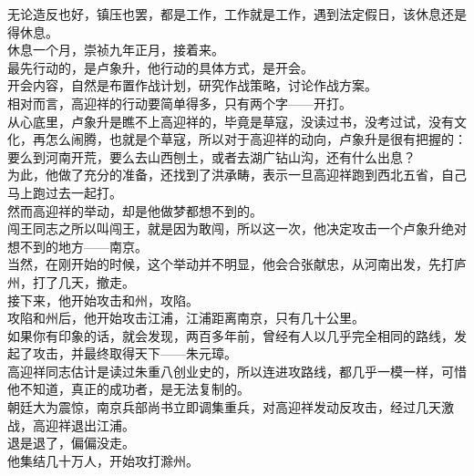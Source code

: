\begin{multicols}{\theparacolNo}
无论造反也好，镇压也罢，都是工作，工作就是工作，遇到法定假日，该休息还是得休息。\\

休息一个月，崇祯九年正月，接着来。\\

最先行动的，是卢象升，他行动的具体方式，是开会。\\

开会内容，自然是布置作战计划，研究作战策略，讨论作战方案。\\

相对而言，高迎祥的行动要简单得多，只有两个字——开打。\\

从心底里，卢象升是瞧不上高迎祥的，毕竟是草寇，没读过书，没考过试，没有文化，再怎么闹腾，也就是个草寇，所以对于高迎祥的动向，卢象升是很有把握的：要么到河南开荒，要么去山西刨土，或者去湖广钻山沟，还有什么出息？\\

为此，他做了充分的准备，还找到了洪承畴，表示一旦高迎祥跑到西北五省，自己马上跑过去一起打。\\

然而高迎祥的举动，却是他做梦都想不到的。\\

闯王同志之所以叫闯王，就是因为敢闯，所以这一次，他决定攻击一个卢象升绝对想不到的地方——南京。\\

当然，在刚开始的时候，这个举动并不明显，他会合张献忠，从河南出发，先打庐州，打了几天，撤走。\\

接下来，他开始攻击和州，攻陷。\\

攻陷和州后，他开始攻击江浦，江浦距离南京，只有几十公里。\\

如果你有印象的话，就会发现，两百多年前，曾经有人以几乎完全相同的路线，发起了攻击，并最终取得天下——朱元璋。\\

高迎祥同志估计是读过朱重八创业史的，所以连进攻路线，都几乎一模一样，可惜他不知道，真正的成功者，是无法复制的。\\

朝廷大为震惊，南京兵部尚书立即调集重兵，对高迎祥发动反攻击，经过几天激战，高迎祥退出江浦。\\

退是退了，偏偏没走。\\

他集结几十万人，开始攻打滁州。\\


\end{multicols}
